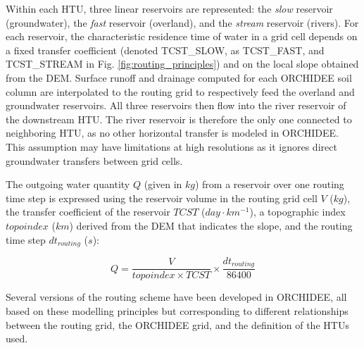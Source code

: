 Within each HTU, three linear reservoirs are represented: the \textit{slow} reservoir (groundwater), the \textit{fast} reservoir (overland), and the \textit{stream} reservoir (rivers). For each reservoir, the characteristic residence time of water in a grid cell depends on a fixed transfer coefficient (denoted TCST\_SLOW, as TCST\_FAST, and TCST\_STREAM in Fig. \ref{fig:routing_principles}) and on the local slope obtained from the DEM.
Surface runoff and drainage computed for each ORCHIDEE soil column are interpolated to the routing grid to respectively feed the overland and groundwater reservoirs. All three reservoirs then flow into the river reservoir of the downstream HTU. The river reservoir is therefore the only one connected to neighboring HTU, as no other horizontal transfer is modeled in ORCHIDEE. This assumption may have limitations at high resolutions as it ignores direct groundwater transfers between grid cells.

The outgoing water quantity $Q$ (given in $kg$) from a reservoir over one routing time step is expressed using the reservoir volume in the routing grid cell $V$ ($kg$), the transfer coefficient of the reservoir $TCST$ ($day \cdot km^{-1}$), a topographic index $topoindex$ ($km$) derived from the DEM that indicates the slope, and the routing time step $dt_{routing}$ ($s$):

\begin{equation}
    Q = \frac{V}{topoindex \times TCST} \times \frac{dt_{routing}}{86400}
\end{equation}

Several versions of the routing scheme have been developed in ORCHIDEE, all based on these modelling principles but corresponding to different relationships between the routing grid, the ORCHIDEE grid, and the definition of the HTUs used.

